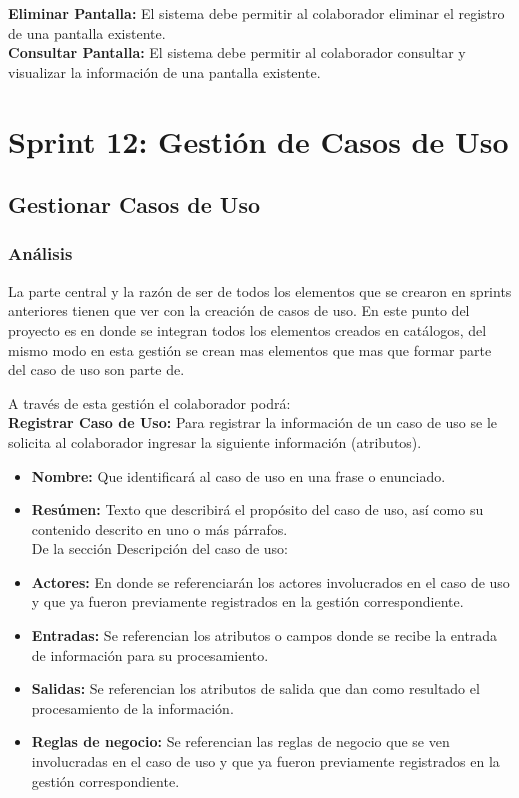 \textbf {Eliminar Pantalla:} 
El sistema debe permitir al colaborador eliminar el registro de una pantalla existente.\\

\textbf {Consultar Pantalla:} 
El sistema debe permitir al colaborador consultar y visualizar la información de una pantalla existente.\\

\section{Sprint 12: Gestión de Casos de Uso}

\subsection{Gestionar Casos de Uso}
\subsubsection {Análisis}

La parte central y la razón de ser de todos los elementos que se crearon en sprints anteriores tienen que ver con la creación de casos de uso. En este punto del proyecto es en donde se integran todos los elementos creados en catálogos, del mismo modo en esta gestión se crean mas elementos que mas que formar parte del caso de uso son parte de.

A través de esta gestión el colaborador podrá:\\

\textbf {Registrar Caso de Uso:}
Para registrar la información de un caso de uso se le solicita al colaborador ingresar la siguiente información (atributos).
\begin{itemize}
	
	\item \textbf{Nombre:} Que identificará al caso de uso en una frase o enunciado.
	\item \textbf{Resúmen:} Texto que describirá el propósito del caso de uso, así como su contenido descrito en uno o más párrafos.\\
	De la sección Descripción del caso de uso:
	\item \textbf{Actores:} En donde se referenciarán los actores involucrados en el caso de uso y que ya fueron previamente registrados en la gestión correspondiente.
	\item \textbf{Entradas:} Se referencian los atributos o campos donde se recibe la entrada de información para su procesamiento.
	\item \textbf{Salidas:} Se referencian los atributos de salida que dan como resultado el procesamiento de la información.
	\item \textbf{Reglas de negocio:} Se referencian las reglas de negocio que se ven involucradas en el caso de uso y que ya fueron previamente registrados en la gestión correspondiente.
	
\end{itemize}

